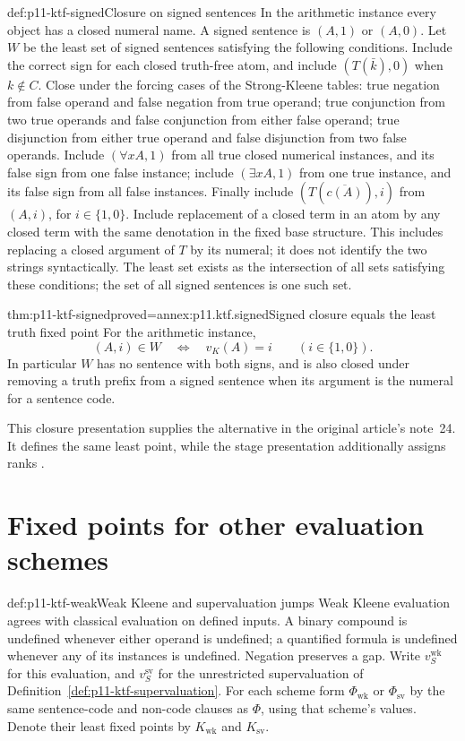 \begin{hbdefinition}{def:p11-ktf-signed}{Closure on signed sentences}
In the arithmetic instance every object has a closed numeral name. A signed
sentence is \((A,1)\) or \((A,0)\). Let \(W\) be the least set of
signed sentences satisfying the following conditions. Include the correct
sign for each closed truth-free atom, and include \((T(\bar k),0)\) when
\(k\notin C\). Close under the forcing cases of the Strong-Kleene
tables: true negation from false operand and false negation from true
operand; true conjunction from two true operands and false conjunction
from either false operand; true disjunction from either true operand and
false disjunction from two false operands. Include \((\forall x A,1)\)
from all true closed numerical instances, and its false sign from one
false instance; include \((\exists x A,1)\) from one true instance,
and its false sign from all false instances. Finally include
\((T(\overline{c(A)}),i)\) from \((A,i)\), for \(i\in\{1,0\}\).
Include replacement of a closed term in an atom by any closed term with
the same denotation in the fixed base structure. This includes replacing
a closed argument of \(T\) by its numeral; it does not identify the
two strings syntactically.
The least set exists as the intersection of all sets satisfying these
conditions; the set of all signed sentences is one such set.
\end{hbdefinition}

\begin{hbtheorem}{thm:p11-ktf-signed}{proved=annex:p11.ktf.signed}{Signed closure equals the least truth fixed point}
For the arithmetic instance,
\[
 (A,i)\in W\quad\Longleftrightarrow\quad v_K(A)=i
 \qquad(i\in\{1,0\}).
\]
In particular \(W\) has no sentence with both signs, and is also closed
under removing a truth prefix from a signed sentence when its argument is
the numeral for a sentence code.
\end{hbtheorem}

This closure presentation supplies the alternative in the original
article's note~24. It defines the same least point, while the stage
presentation additionally assigns ranks \cite[p.~706 n.~24]{Kripke1975}.

\section{Fixed points for other evaluation schemes}

\begin{hbdefinition}{def:p11-ktf-weak}{Weak Kleene and supervaluation jumps}
Weak Kleene evaluation agrees with classical evaluation on defined inputs.
A binary compound is undefined whenever either operand is undefined;
a quantified formula is undefined whenever any of its instances is
undefined. Negation preserves a gap. Write \(v^{\mathrm{wk}}_S\)
for this evaluation, and \(v^{\mathrm{sv}}_S\) for the unrestricted
supervaluation of Definition~\ref{def:p11-ktf-supervaluation}.
For each scheme form \(\Phi_{\mathrm{wk}}\) or
\(\Phi_{\mathrm{sv}}\) by the same sentence-code and non-code
clauses as \(\Phi\), using that scheme's values. Denote their
least fixed points by \(K_{\mathrm{wk}}\) and \(K_{\mathrm{sv}}\).
\end{hbdefinition}

